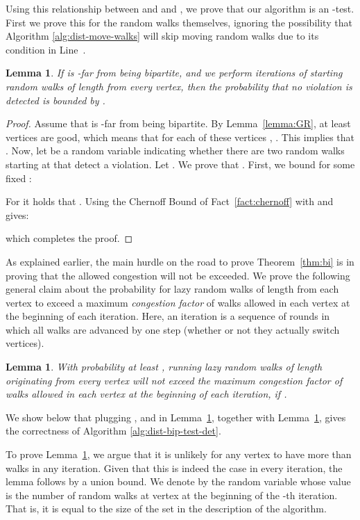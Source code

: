 \documentclass[11pt]{article}
\newtheorem{lemma}[theorem]{Lemma}
\begin{document}
Using this relationship between  and  and , we prove that our algorithm is an
-test. First we prove this for the random walks themselves, ignoring the possibility that
Algorithm \ref{alg:dist-move-walks} will skip moving random walks due to its condition in Line~.

\begin{lemma}\label{lem:walks-detect}
If  is -far from being bipartite, and we perform  iterations of starting  random walks of length  from every vertex, then the probability that no violation is detected is bounded by .
\end{lemma}


\begin{proof}
Assume that  is -far from being bipartite. By Lemma~\ref{lemma:GR}, at least  vertices are good, which means that for each of these vertices , . This implies that .
Now, let  be a random variable indicating whether there are two random walks starting at  that detect a violation. Let . We prove that . First, we bound  for some fixed :

For  it holds that .
Using the Chernoff Bound of Fact~\ref{fact:chernoff} with  and  gives:

which completes the proof.
\end{proof}


As explained earlier, the main hurdle on the road to prove Theorem~\ref{thm:bi} is in proving that the allowed congestion will not be exceeded. We prove the following general claim about the probability for  lazy random walks of length  from each vertex to exceed a maximum \emph{congestion factor} of  walks allowed in each vertex at the beginning of each iteration. Here, an iteration is a sequence of rounds in which all walks are advanced by one step (whether or not they actually switch vertices).
\begin{lemma}
\label{lemma:cong}
With probability at least , running  lazy random walks of length  originating from
every vertex will not exceed the maximum \emph{congestion factor} of  walks allowed in each vertex at the beginning of each iteration, if .
\end{lemma}
We show below that plugging ,  and  in Lemma~\ref{lemma:cong}, together with Lemma~\ref{lem:walks-detect}, gives the correctness of Algorithm \ref{alg:dist-bip-test-det}.

To prove Lemma~\ref{lemma:cong}, we argue that it is unlikely for any vertex to have more than  walks in any iteration. Given that this is indeed the case in every iteration, the lemma follows by a union bound. We denote by  the random variable whose value is the number of random walks at vertex  at the beginning of the -th iteration. That is, it is equal to the size of the set  in the description of the algorithm.
\end{document}
